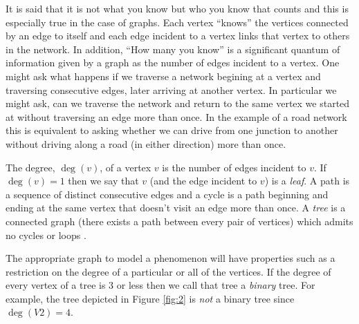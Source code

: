 \documentclass[10pt]{amsart} %
\theoremstyle{definition}
\newtheorem{ex}[thm]{Example}
\begin{document}
It is said that it is not what you know but who you know that counts and this is especially true in the case of graphs. Each vertex ``knows'' the vertices connected by an edge to itself and each edge incident to a vertex links that vertex to others in the network. In addition, ``How many you know'' is a significant quantum of information given by a graph as the number of edges incident to a vertex.  One might ask what happens if we traverse a network begining at a vertex and traversing consecutive edges, later arriving at another vertex. In particular we might ask, can we traverse the network and return to the same vertex we started at without traversing an edge more than once. In the example of a road network this is equivalent to asking whether we can drive from one junction to another without driving along a road (in either direction) more than once.         

The degree, $\deg(v)$, of a vertex $v$ is the number of edges incident to $v$.  If $\deg(v) = 1$ then we say that $v$ (and the edge incident to $v$) is a  \emph{leaf}. A path is a sequence of distinct consecutive edges and a cycle is a path beginning and ending at the same vertex that doesn't visit an edge more than once.  A \emph{tree} is  a connected graph (there exists a path between every pair of vertices) which admits no cycles or loops \cite{bela}.  

The appropriate graph to model a phenomenon will have properties such as a restriction on the degree of a particular or all of the vertices.  If the degree of every vertex of a tree is 3 or less then we call that tree a \emph{binary} tree.  For example, the tree depicted in Figure \ref{fig:2} is \emph{not} a binary tree since $\deg(V2) = 4$.

\end{document}
